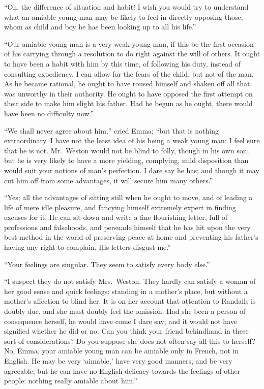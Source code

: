 ``Oh, the difference of situation and habit!  I wish you would try
to understand what an amiable young man may be likely to feel
in directly opposing those, whom as child and boy he has been
looking up to all his life.''

``Our amiable young man is a very weak young man, if this be the first
occasion of his carrying through a resolution to do right against
the will of others.  It ought to have been a habit with him by
this time, of following his duty, instead of consulting expediency.
I can allow for the fears of the child, but not of the man.
As he became rational, he ought to have roused himself and shaken off
all that was unworthy in their authority.  He ought to have opposed
the first attempt on their side to make him slight his father.
Had he begun as he ought, there would have been no difficulty now.''

``We shall never agree about him,'' cried Emma; ``but that is
nothing extraordinary.  I have not the least idea of his being
a weak young man:  I feel sure that he is not.  Mr.\ Weston would
not be blind to folly, though in his own son; but he is very likely
to have a more yielding, complying, mild disposition than would suit
your notions of man's perfection.  I dare say he has; and though
it may cut him off from some advantages, it will secure him many others.''

``Yes; all the advantages of sitting still when he ought to move,
and of leading a life of mere idle pleasure, and fancying himself
extremely expert in finding excuses for it.  He can sit down and
write a fine flourishing letter, full of professions and falsehoods,
and persuade himself that he has hit upon the very best method
in the world of preserving peace at home and preventing his father's
having any right to complain.  His letters disgust me.''

``Your feelings are singular.  They seem to satisfy every body else.''

``I suspect they do not satisfy Mrs.\ Weston.  They hardly can
satisfy a woman of her good sense and quick feelings:  standing in
a mother's place, but without a mother's affection to blind her.
It is on her account that attention to Randalls is doubly due,
and she must doubly feel the omission.  Had she been a person
of consequence herself, he would have come I dare say; and it would
not have signified whether he did or no.  Can you think your friend
behindhand in these sort of considerations?  Do you suppose she
does not often say all this to herself?  No, Emma, your amiable
young man can be amiable only in French, not in English.  He may be
very `aimable,' have very good manners, and be very agreeable; but he
can have no English delicacy towards the feelings of other people:
nothing really amiable about him.''

